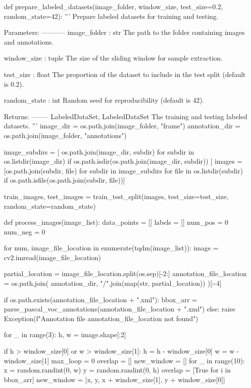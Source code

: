 \begin{pythoncode}
def prepare_labeled_datasets(image_folder, window_size, test_size=0.2, random_state=42):
    '''
    Prepare labeled datasets for training and testing.

    Parameters:
    -----------
    image_folder : str
        The path to the folder containing images and annotations.
    
    window_size : tuple
        The size of the sliding window for sample extraction.
    
    test_size : float
        The proportion of the dataset to include in the test split (default is 0.2).
    
    random_state : int
        Random seed for reproducibility (default is 42).

    Returns:
    --------
    LabeledDataSet, LabeledDataSet
        The training and testing labeled datasets.
    '''
    image_dir = os.path.join(image_folder, "frame")
    annotation_dir = os.path.join(image_folder, "annotations")

    image_subdirs = [
        os.path.join(image_dir, subdir)
        for subdir in os.listdir(image_dir)
        if os.path.isdir(os.path.join(image_dir, subdir))
    ]
    images = [os.path.join(subdir, file) for subdir in image_subdirs for file in os.listdir(subdir) if
              os.path.isfile(os.path.join(subdir, file))]


    train_images, test_images = train_test_split(images, test_size=test_size, random_state=random_state)

    def process_images(image_list):
        data_points = []
        labels = []
        num_pos = 0
        num_neg = 0

        for num, image_file_location in enumerate(tqdm(image_list)):
            image = cv2.imread(image_file_location)

            partial_location = image_file_location.split(os.sep)[-2:]
            annotation_file_location = os.path.join(
                annotation_dir,
                "/".join(map(str, partial_location))
            )[:-4]

            if os.path.exists(annotation_file_location + ".xml"):
                bbox_arr = parse_pascal_voc_annotations(annotation_file_location + ".xml")
            else:
                raise Exception(f"Annotation file {annotation_file_location} not found")

            for _ in range(3):
                h, w = image.shape[:2]

                if h > window_size[0] or w > window_size[1]:
                    h = h - window_size[0]
                    w = w - window_size[1]
                    max_loop = 0
                    overlap = []
                    new_window = []
                    for _ in range(10):
                        x = random.randint(0, w)
                        y = random.randint(0, h)
                        overlap = [True for i in bbox_arr]
                        new_window = [x, y, x + window_size[1], y + window_size[0]]
                        

\end{pythoncode}
